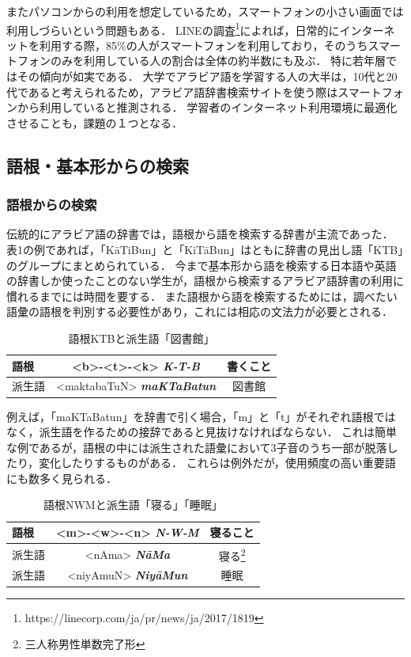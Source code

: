 \documentclass[technicalreport]{ieicej}
\begin{document}
またパソコンからの利用を想定しているため，スマートフォンの小さい画面では利用しづらいという問題もある．
LINEの調査\footnote{https://linecorp.com/ja/pr/news/ja/2017/1819}によれば，日常的にインターネットを利用する際，85\%の人がスマートフォンを利用しており，そのうちスマートフォンのみを利用している人の割合は全体の約半数にも及ぶ．
特に若年層ではその傾向が如実である．
大学でアラビア語を学習する人の大半は，10代と20代であると考えられるため，アラビア語辞書検索サイトを使う際はスマートフォンから利用していると推測される．
学習者のインターネット利用環境に最適化させることも，課題の１つとなる．

\subsection{語根・基本形からの検索}
\subsubsection{語根からの検索}
伝統的にアラビア語の辞書では，語根から語を検索する辞書が主流であった．
表1の例であれば，「K\=aTiBun」と「KiT\=aBun」はともに辞書の見出し語「KTB」のグループにまとめられている．
今まで基本形から語を検索する日本語や英語の辞書しか使ったことのない学生が，語根から検索するアラビア語辞書の利用に慣れるまでには時間を要する．
また語根から語を検索するためには，調べたい語彙の語根を判別する必要性があり，これには相応の文法力が必要とされる．

\begin{table}[ht]
\begin{center}
\begin{tabular}{l|cc}
   語根 & <b>-<t>-<k> \textit{\textbf{K-T-B}} & 書くこと\\
  \hline
 派生語 & <maktabaTuN> \textit{\textbf{maKTaBatun}} & 図書館\\
\hline
\end{tabular}
\caption{語根KTBと派生語「図書館」}
\label{table:alignment}
\end{center}
\end{table}

例えば，「maKTaBatun」を辞書で引く場合，「m」と「t」がそれぞれ語根ではなく，派生語を作るための接辞であると見抜けなければならない．
これは簡単な例であるが，語根の中には派生された語彙において3子音のうち一部が脱落したり，変化したりするものがある．
これらは例外だが，使用頻度の高い重要語にも数多く見られる．

\begin{table}[ht]
\begin{center}
\begin{tabular}{l|cc}
   語根 & <m>-<w>-<n> \textit{\textbf{N-W-M}} & 寝ること\\
  \hline
 派生語& <nAma> \textit{\textbf{N\=aMa}} & 寝る\footnote{三人称男性単数完了形}\\
  派生語& <niyAmuN> \textit{\textbf{Niy\=aMun}}& 睡眠\\
\hline
\end{tabular}
\caption{語根NWMと派生語「寝る」「睡眠」}

\label{table:alignment}
\end{center}
\end{table}
\end{document}

